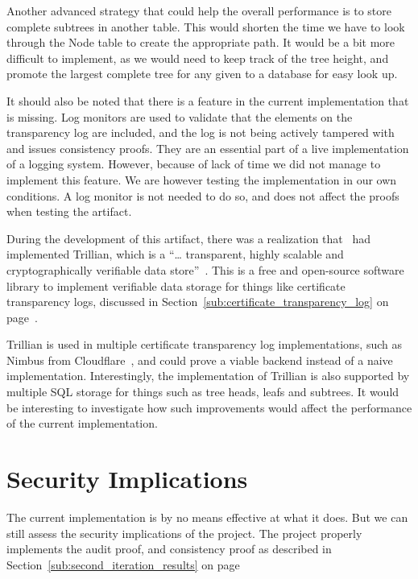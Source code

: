 \documentclass[../Main/thesis.tex]{subfiles}
\begin{document}
Another advanced strategy that could help the overall performance is to store
complete subtrees in another table. This would shorten the time we have to look
through the Node table to create the appropriate path. It would be a bit more
difficult to implement, as we would need to keep track of the tree height, and
promote the largest complete tree for any given to a database for easy look up.

It should also be noted that there is a feature in the current implementation
that is missing. Log monitors are used to validate that the elements on the
transparency log are included, and the log is not being actively tampered with
and issues consistency proofs. They are an essential part of a live
implementation of a logging system. However, because of lack of time we did not
manage to implement this feature. We are however testing the implementation in
our own conditions.  A log monitor is not needed to do so, and does not affect
the proofs when testing the artifact.

During the development of this artifact, there was a realization
that~\citeauthor{trillian} had implemented Trillian, which is a ``\ldots
transparent, highly scalable and cryptographically verifiable data
store''~\cite{trillian}. This is a free and open-source software library to
implement verifiable data storage for things like certificate transparency logs,
discussed in Section~\ref{sub:certificate_transparency_log} on
page~\pageref{sub:certificate_transparency_log}.

Trillian is used in multiple certificate transparency log implementations, such
as Nimbus from Cloudflare~\cite{nimbus}, and could prove a viable backend
instead of a naive implementation. Interestingly, the implementation of Trillian
is also supported by multiple SQL storage for things such as tree heads, leafs
and subtrees. It would be interesting to investigate how such improvements would
affect the performance of the current implementation.

\section{Security Implications}%
\label{sec:security_implications}
The current implementation is by no means effective at what it does. But we can
still assess the security implications of the project. The project properly
implements the audit proof, and consistency proof as described in
Section~\ref{sub:second_iteration_results} on
page~\pageref{sub:second_iteration_results}
\end{document}
